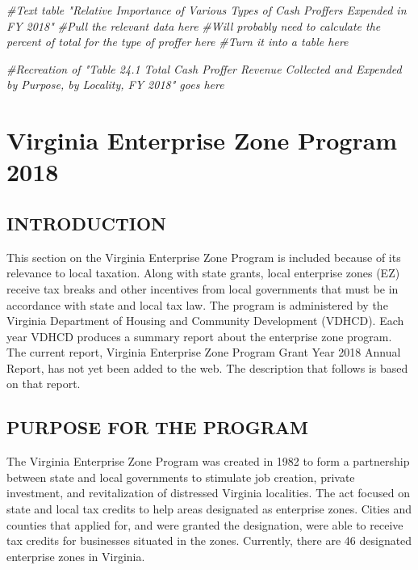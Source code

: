 \documentclass[
]{book}
\newenvironment{Shaded}{\begin{snugshade}}{\end{snugshade}}
\newcommand{\CommentTok}[1]{\textcolor[rgb]{0.56,0.35,0.01}{\textit{#1}}}
\begin{document}
\begin{Shaded}
\begin{Highlighting}[]
\CommentTok{\#Text table "Relative Importance of Various Types of Cash Proffers Expended in FY 2018"}
\CommentTok{\#Pull the relevant data here}
\CommentTok{\#Will probably need to calculate the percent of total for the type of proffer here}
\CommentTok{\#Turn it into a table here}
\end{Highlighting}
\end{Shaded}

\begin{Shaded}
\begin{Highlighting}[]
\CommentTok{\#Recreation of "Table 24.1 Total Cash Proffer Revenue Collected and Expended by Purpose, by Locality, FY 2018" goes here}
\end{Highlighting}
\end{Shaded}

\hypertarget{virginia-enterprise-zone-program-2018}{%
\chapter{Virginia Enterprise Zone Program 2018}\label{virginia-enterprise-zone-program-2018}}

\hypertarget{introduction-1}{%
\section{INTRODUCTION}\label{introduction-1}}

This section on the Virginia Enterprise Zone Program is included because of its relevance to local taxation. Along with state grants, local enterprise zones (EZ) receive tax breaks and other incentives from local governments that must be in accordance with state and local tax law. The program is administered by the Virginia Department of Housing and Community Development (VDHCD). Each year VDHCD produces a summary report about the enterprise zone program. The current report, Virginia Enterprise Zone Program Grant Year 2018 Annual Report, has not yet been added to the web. The description that follows is based on that report.

\hypertarget{purpose-for-the-program}{%
\section{PURPOSE FOR THE PROGRAM}\label{purpose-for-the-program}}

The Virginia Enterprise Zone Program was created in 1982 to form a partnership between state and local governments to stimulate job creation, private investment, and revitalization of distressed Virginia localities. The act focused on state and local tax credits to help areas designated as enterprise zones. Cities and counties that applied for, and were granted the designation, were able to receive tax credits for businesses situated in the zones. Currently, there are 46 designated enterprise zones in Virginia.
\end{document}

